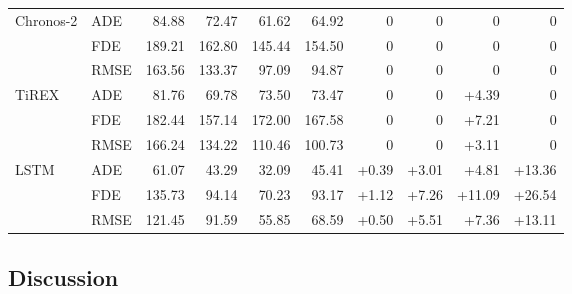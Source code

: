 \begin{table}[h]
\begin{tabular}{llrrrrrrrr}
            \midrule
            Chronos-2           
            & ADE  & 84.88 & 72.47 & 61.62 & 64.92 & 0 & 0 & 0 & 0 \\
            & FDE  & 189.21 & 162.80 & 145.44 & 154.50 & 0 & 0 & 0 & 0 \\
            & RMSE & 163.56 & 133.37 & 97.09 & 94.87 & 0 & 0 & 0 & 0 \\
            \midrule
            TiREX               
            & ADE  & 81.76 & 69.78 & 73.50 & 73.47 & 0 & 0 & +4.39 & 0 \\
            & FDE  & 182.44 & 157.14 & 172.00 & 167.58 & 0 & 0 & +7.21 & 0 \\
            & RMSE & 166.24 & 134.22 & 110.46 & 100.73 & 0 & 0 & +3.11 & 0 \\
            \midrule
            LSTM                
            & ADE  & 61.07 & 43.29 & 32.09 & 45.41 & +0.39 & +3.01 & +4.81 & +13.36 \\
            & FDE  & 135.73 & 94.14 & 70.23 & 93.17 & +1.12 & +7.26 & +11.09 & +26.54 \\
            & RMSE & 121.45 & 91.59 & 55.85 & 68.59 & +0.50 & +5.51 & +7.36 & +13.11 \\
            \bottomrule
            \end{tabular}
            \end{table}
            
\FloatBarrier %
\subsection{Discussion}
